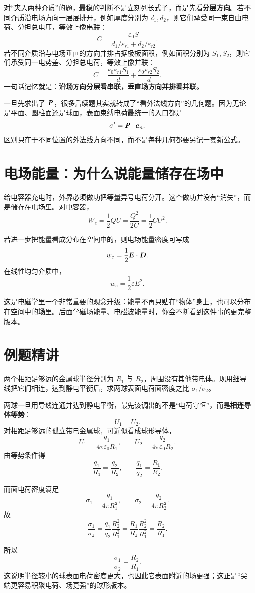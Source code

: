 \documentclass[lang=cn,11pt]{elegantbook}
\newcommand{\bridge}[1]{\begin{note}#1\end{note}}
\begin{document}
\begin{remark}
对“夹入两种介质”的题，最稳的判断不是立刻列长式子，而是先看\textbf{分层方向}。若不同介质沿电场方向一层层排开，例如厚度分别为 \(d_1,d_2\)，则它们承受同一束自由电荷、分担总电压，等效上像串联：
\[
C=\frac{\varepsilon_0 S}{d_1/\varepsilon_{r1}+d_2/\varepsilon_{r2}}.
\]
若不同介质沿与电场垂直的方向并排占据极板面积，例如面积分别为 \(S_1,S_2\)，则它们承受同一电势差、分担总电荷，等效上像并联：
\[
C=\frac{\varepsilon_0\varepsilon_{r1}S_1}{d}+\frac{\varepsilon_0\varepsilon_{r2}S_2}{d}.
\]
一句话记忆就是：\textbf{沿场方向分层看串联，垂直场方向并排看并联。}
\end{remark}

\bridge{一旦先求出了 \(\vb*{P}\)，很多后续题其实就转成了“看外法线方向”的几何题。因为无论是平面、圆柱面还是球面，表面束缚电荷最统一的入口都是
\[
\sigma'=\vb*{P}\cdot \vb*{e}_n.
\]
区别只在于不同位置的外法线方向不同，而不是每种几何都要另记一套新公式。}

\section{电场能量：为什么说能量储存在场中}

给电容器充电时，外界必须做功把等量异号电荷分开。这个做功并没有“消失”，而是储存在电场里。对电容器，
\[
W_e=\frac{1}{2}QU
=\frac{Q^2}{2C}
=\frac{1}{2}CU^2.
\]

若进一步把能量看成分布在空间中的，则电场能量密度可写成
\[
w_e=\frac{1}{2}\vb*{E}\cdot \vb*{D}.
\]
在线性均匀介质中，
\[
w_e=\frac{1}{2}\varepsilon E^2.
\]

\bridge{这是电磁学里一个非常重要的观念升级：能量不再只贴在“物体”身上，也可以分布在空间中的\textbf{场}里。后面学磁场能量、电磁波能量时，你会不断看到这件事的更完整版本。}

\section{例题精讲}

\begin{example}[相连金属球的表面电荷密度比]
两个相距足够远的金属球半径分别为 \(R_1\) 与 \(R_2\)，周围没有其他带电体。现用细导线把它们相连，达到静电平衡后，求两球表面电荷面密度之比 \(\sigma_1/\sigma_2\)。
\end{example}

\begin{solution}
两球一旦用导线连通并达到静电平衡，最先该调出的不是“电荷守恒”，而是\textbf{相连导体等势}：
\[
U_1=U_2.
\]
对相距足够远的孤立带电金属球，可近似看成球形导体，
\[
U_1=\frac{q_1}{4\pi\varepsilon_0R_1},
\qquad
U_2=\frac{q_2}{4\pi\varepsilon_0R_2}.
\]
由等势条件得
\[
\frac{q_1}{R_1}=\frac{q_2}{R_2},
\qquad
\frac{q_1}{q_2}=\frac{R_1}{R_2}.
\]

而面电荷密度满足
\[
\sigma_1=\frac{q_1}{4\pi R_1^2},
\qquad
\sigma_2=\frac{q_2}{4\pi R_2^2}.
\]
故
\[
\frac{\sigma_1}{\sigma_2}
=\frac{q_1}{q_2}\frac{R_2^2}{R_1^2}
=\frac{R_1}{R_2}\frac{R_2^2}{R_1^2}
=\frac{R_2}{R_1}.
\]

所以
\[
\boxed{\frac{\sigma_1}{\sigma_2}=\frac{R_2}{R_1}}.
\]
这说明半径较小的球表面电荷密度更大，也因此它表面附近的场更强；这正是“尖端更容易积聚电荷、场更强”的球形版本。
\end{solution}
\end{document}
